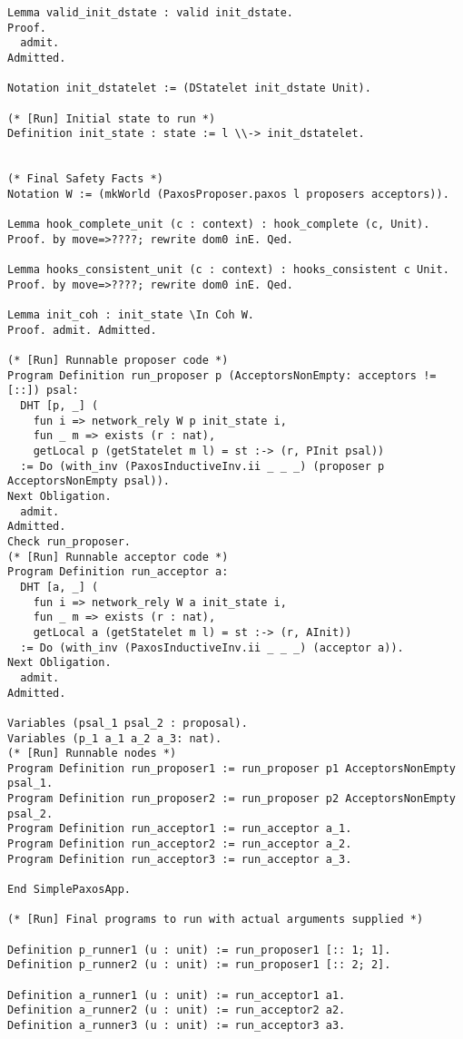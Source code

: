 \begin{landscape}
\begin{multicols*}{2}
\begin{lstlisting}[style=SourceCodeListing]
Lemma valid_init_dstate : valid init_dstate.
Proof.
  admit.
Admitted.

Notation init_dstatelet := (DStatelet init_dstate Unit).

(* [Run] Initial state to run *)
Definition init_state : state := l \\-> init_dstatelet.


(* Final Safety Facts *)
Notation W := (mkWorld (PaxosProposer.paxos l proposers acceptors)).

Lemma hook_complete_unit (c : context) : hook_complete (c, Unit).
Proof. by move=>????; rewrite dom0 inE. Qed.

Lemma hooks_consistent_unit (c : context) : hooks_consistent c Unit.
Proof. by move=>????; rewrite dom0 inE. Qed.

Lemma init_coh : init_state \In Coh W.
Proof. admit. Admitted.

(* [Run] Runnable proposer code *)
Program Definition run_proposer p (AcceptorsNonEmpty: acceptors != [::]) psal:
  DHT [p, _] (
    fun i => network_rely W p init_state i,
    fun _ m => exists (r : nat),
    getLocal p (getStatelet m l) = st :-> (r, PInit psal))
  := Do (with_inv (PaxosInductiveInv.ii _ _ _) (proposer p AcceptorsNonEmpty psal)).
Next Obligation.
  admit.
Admitted.
Check run_proposer.
(* [Run] Runnable acceptor code *)
Program Definition run_acceptor a:
  DHT [a, _] (
    fun i => network_rely W a init_state i,
    fun _ m => exists (r : nat),
    getLocal a (getStatelet m l) = st :-> (r, AInit))
  := Do (with_inv (PaxosInductiveInv.ii _ _ _) (acceptor a)).
Next Obligation.
  admit.
Admitted.

Variables (psal_1 psal_2 : proposal).
Variables (p_1 a_1 a_2 a_3: nat).
(* [Run] Runnable nodes *)
Program Definition run_proposer1 := run_proposer p1 AcceptorsNonEmpty psal_1.
Program Definition run_proposer2 := run_proposer p2 AcceptorsNonEmpty psal_2.
Program Definition run_acceptor1 := run_acceptor a_1.
Program Definition run_acceptor2 := run_acceptor a_2.
Program Definition run_acceptor3 := run_acceptor a_3.

End SimplePaxosApp.

(* [Run] Final programs to run with actual arguments supplied *)

Definition p_runner1 (u : unit) := run_proposer1 [:: 1; 1].
Definition p_runner2 (u : unit) := run_proposer1 [:: 2; 2].

Definition a_runner1 (u : unit) := run_acceptor1 a1.
Definition a_runner2 (u : unit) := run_acceptor2 a2.
Definition a_runner3 (u : unit) := run_acceptor3 a3.
\end{lstlisting}


\end{multicols*}
\end{landscape}
